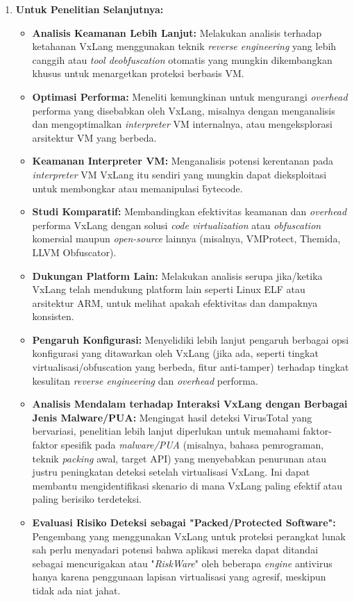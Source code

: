 \begin{enumerate}
    \item \textbf{Untuk Penelitian Selanjutnya:}
        \begin{itemize}
            \item \textbf{Analisis Keamanan Lebih Lanjut:} Melakukan analisis terhadap ketahanan VxLang menggunakan teknik \textit{reverse engineering} yang lebih canggih atau \textit{tool deobfuscation} otomatis yang mungkin dikembangkan khusus untuk menargetkan proteksi berbasis VM.
            \item \textbf{Optimasi Performa:} Meneliti kemungkinan untuk mengurangi \textit{overhead} performa yang disebabkan oleh VxLang, misalnya dengan menganalisis dan mengoptimalkan \textit{interpreter} VM internalnya, atau mengeksplorasi arsitektur VM yang berbeda.
            \item \textbf{Keamanan Interpreter VM:} Menganalisis potensi kerentanan pada \textit{interpreter} VM VxLang itu sendiri yang mungkin dapat dieksploitasi untuk membongkar atau memanipulasi \f{bytecode}.
            \item \textbf{Studi Komparatif:} Membandingkan efektivitas keamanan dan \textit{overhead} performa VxLang dengan solusi \textit{code virtualization} atau \textit{obfuscation} komersial maupun \textit{open-source} lainnya (misalnya, VMProtect, Themida, LLVM Obfuscator).
            \item \textbf{Dukungan Platform Lain:} Melakukan analisis serupa jika/ketika VxLang telah mendukung platform lain seperti Linux ELF atau arsitektur ARM, untuk melihat apakah efektivitas dan dampaknya konsisten.
            \item \textbf{Pengaruh Konfigurasi:} Menyelidiki lebih lanjut pengaruh berbagai opsi konfigurasi yang ditawarkan oleh VxLang (jika ada, seperti tingkat virtualisasi/obfuscation yang berbeda, fitur anti-tamper) terhadap tingkat kesulitan \textit{reverse engineering} dan \textit{overhead} performa.
            \item \textbf{Analisis Mendalam terhadap Interaksi VxLang dengan Berbagai Jenis Malware/PUA:} Mengingat hasil deteksi VirusTotal yang bervariasi, penelitian lebih lanjut diperlukan untuk memahami faktor-faktor spesifik pada \textit{malware/PUA} (misalnya, bahasa pemrograman, teknik \textit{packing} awal, target API) yang menyebabkan penurunan atau justru peningkatan deteksi setelah virtualisasi VxLang. Ini dapat membantu mengidentifikasi skenario di mana VxLang paling efektif atau paling berisiko terdeteksi.
\item \textbf{Evaluasi Risiko Deteksi sebagai "Packed/Protected Software":} Pengembang yang menggunakan VxLang untuk proteksi perangkat lunak sah perlu menyadari potensi bahwa aplikasi mereka dapat ditandai sebagai mencurigakan atau "\textit{RiskWare}" oleh beberapa \textit{engine} antivirus hanya karena penggunaan lapisan virtualisasi yang agresif, meskipun tidak ada niat jahat.

\end{itemize}
\end{enumerate}
